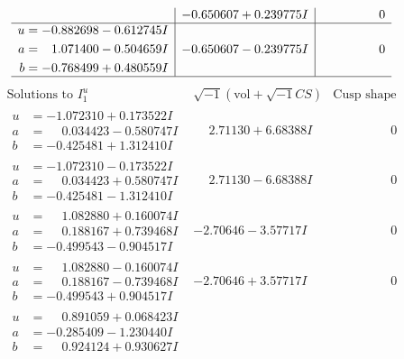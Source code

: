 \documentclass[1p]{elsarticle_modified}
\theoremstyle{definition}
\newcommand{\I}{\sqrt{-1}}
\begin{document}
$$\begin{array}{c|c|c}
 & -0.650607 + 0.239775 I & \phantom{-0.000000 } 0 \\ \hline\begin{aligned}
u &= -0.882698 - 0.612745 I \\
a &= \phantom{-}1.071400 - 0.504659 I \\
b &= -0.768499 + 0.480559 I\end{aligned}
 & -0.650607 - 0.239775 I & \phantom{-0.000000 } 0\\
 \hline 
 \end{array}$$\newpage$$\begin{array}{c|c|c}  
\text{Solutions to }I^u_{1}& \I (\text{vol} + \sqrt{-1}CS) & \text{Cusp shape}\\
 \hline 
\begin{aligned}
u &= -1.072310 + 0.173522 I \\
a &= \phantom{-}0.034423 - 0.580747 I \\
b &= -0.425481 + 1.312410 I\end{aligned}
 & \phantom{-}2.71130 + 6.68388 I & \phantom{-0.000000 } 0 \\ \hline\begin{aligned}
u &= -1.072310 - 0.173522 I \\
a &= \phantom{-}0.034423 + 0.580747 I \\
b &= -0.425481 - 1.312410 I\end{aligned}
 & \phantom{-}2.71130 - 6.68388 I & \phantom{-0.000000 } 0 \\ \hline\begin{aligned}
u &= \phantom{-}1.082880 + 0.160074 I \\
a &= \phantom{-}0.188167 + 0.739468 I \\
b &= -0.499543 - 0.904517 I\end{aligned}
 & -2.70646 - 3.57717 I & \phantom{-0.000000 } 0 \\ \hline\begin{aligned}
u &= \phantom{-}1.082880 - 0.160074 I \\
a &= \phantom{-}0.188167 - 0.739468 I \\
b &= -0.499543 + 0.904517 I\end{aligned}
 & -2.70646 + 3.57717 I & \phantom{-0.000000 } 0 \\ \hline\begin{aligned}
u &= \phantom{-}0.891059 + 0.068423 I \\
a &= -0.285409 - 1.230440 I \\
b &= \phantom{-}0.924124 + 0.930627 I\end{aligned}

\end{array}$$
\end{document}
